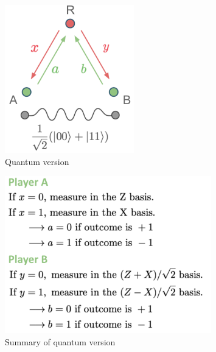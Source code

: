 \begin{figure}[H]
    \centering
    \includegraphics[width=0.5\textwidth]{lesson4/CHSH_quantum_diagram.pdf}
    \begin{center}
        \caption{Quantum version}
    \end{center}
    \label{fig:chsh-quantum}
\end{figure}

\begin{figure}[H]
    \centering
    \includegraphics[width=0.8\textwidth]{lesson4/CHSH_quantum_guide.pdf}
    \begin{center}
        \caption{Summary of quantum version}
    \end{center}
    \label{fig:chsh-quantum-summary}
\end{figure}

